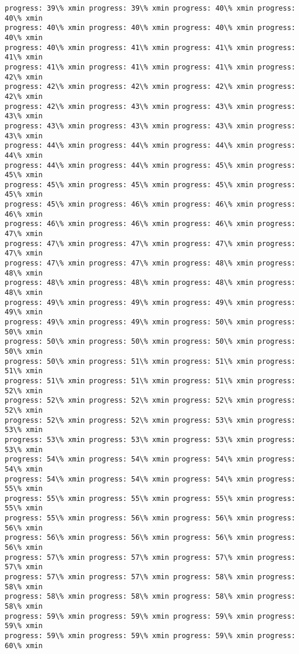 \documentclass[11pt]{article}
\begin{document}
\begin{Verbatim}[commandchars=\\\{\}]
progress: 39\% xmin progress: 39\% xmin progress: 40\% xmin progress: 40\% xmin
progress: 40\% xmin progress: 40\% xmin progress: 40\% xmin progress: 40\% xmin
progress: 40\% xmin progress: 41\% xmin progress: 41\% xmin progress: 41\% xmin
progress: 41\% xmin progress: 41\% xmin progress: 41\% xmin progress: 42\% xmin
progress: 42\% xmin progress: 42\% xmin progress: 42\% xmin progress: 42\% xmin
progress: 42\% xmin progress: 43\% xmin progress: 43\% xmin progress: 43\% xmin
progress: 43\% xmin progress: 43\% xmin progress: 43\% xmin progress: 43\% xmin
progress: 44\% xmin progress: 44\% xmin progress: 44\% xmin progress: 44\% xmin
progress: 44\% xmin progress: 44\% xmin progress: 45\% xmin progress: 45\% xmin
progress: 45\% xmin progress: 45\% xmin progress: 45\% xmin progress: 45\% xmin
progress: 45\% xmin progress: 46\% xmin progress: 46\% xmin progress: 46\% xmin
progress: 46\% xmin progress: 46\% xmin progress: 46\% xmin progress: 47\% xmin
progress: 47\% xmin progress: 47\% xmin progress: 47\% xmin progress: 47\% xmin
progress: 47\% xmin progress: 47\% xmin progress: 48\% xmin progress: 48\% xmin
progress: 48\% xmin progress: 48\% xmin progress: 48\% xmin progress: 48\% xmin
progress: 49\% xmin progress: 49\% xmin progress: 49\% xmin progress: 49\% xmin
progress: 49\% xmin progress: 49\% xmin progress: 50\% xmin progress: 50\% xmin
progress: 50\% xmin progress: 50\% xmin progress: 50\% xmin progress: 50\% xmin
progress: 50\% xmin progress: 51\% xmin progress: 51\% xmin progress: 51\% xmin
progress: 51\% xmin progress: 51\% xmin progress: 51\% xmin progress: 52\% xmin
progress: 52\% xmin progress: 52\% xmin progress: 52\% xmin progress: 52\% xmin
progress: 52\% xmin progress: 52\% xmin progress: 53\% xmin progress: 53\% xmin
progress: 53\% xmin progress: 53\% xmin progress: 53\% xmin progress: 53\% xmin
progress: 54\% xmin progress: 54\% xmin progress: 54\% xmin progress: 54\% xmin
progress: 54\% xmin progress: 54\% xmin progress: 54\% xmin progress: 55\% xmin
progress: 55\% xmin progress: 55\% xmin progress: 55\% xmin progress: 55\% xmin
progress: 55\% xmin progress: 56\% xmin progress: 56\% xmin progress: 56\% xmin
progress: 56\% xmin progress: 56\% xmin progress: 56\% xmin progress: 56\% xmin
progress: 57\% xmin progress: 57\% xmin progress: 57\% xmin progress: 57\% xmin
progress: 57\% xmin progress: 57\% xmin progress: 58\% xmin progress: 58\% xmin
progress: 58\% xmin progress: 58\% xmin progress: 58\% xmin progress: 58\% xmin
progress: 59\% xmin progress: 59\% xmin progress: 59\% xmin progress: 59\% xmin
progress: 59\% xmin progress: 59\% xmin progress: 59\% xmin progress: 60\% xmin

\end{Verbatim}
\end{document}
